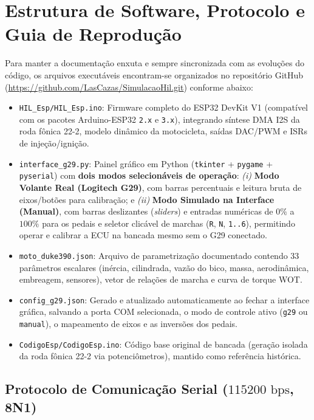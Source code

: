 \documentclass[12pt,a4paper]{article}
\begin{document}
\section{Estrutura de Software, Protocolo e Guia de Reprodução}

Para manter a documentação enxuta e sempre sincronizada com as evoluções do código, os arquivos executáveis encontram-se organizados no repositório GitHub (\url{https://github.com/LasCazas/SimulacaoHil.git}) conforme abaixo:

\begin{itemize}[itemsep=2pt]
    \item \texttt{HIL\_Esp/HIL\_Esp.ino}: Firmware completo do ESP32 DevKit V1 (compatível com os pacotes Arduino-ESP32 \texttt{2.x} e \texttt{3.x}), integrando síntese DMA I2S da roda fônica 22-2, modelo dinâmico da motocicleta, saídas DAC/PWM e ISRs de injeção/ignição.
    \item \texttt{interface\_g29.py}: Painel gráfico em Python (\texttt{tkinter} + \texttt{pygame} + \texttt{pyserial}) com \textbf{dois modos selecionáveis de operação}: \textit{(i)} \textbf{Modo Volante Real (Logitech G29)}, com barras percentuais e leitura bruta de eixos/botões para calibração; e \textit{(ii)} \textbf{Modo Simulado na Interface (Manual)}, com barras deslizantes (\textit{sliders}) e entradas numéricas de $0\%$ a $100\%$ para os pedais e seletor clicável de marchas (\texttt{R}, \texttt{N}, \texttt{1..6}), permitindo operar e calibrar a ECU na bancada mesmo sem o G29 conectado.
    \item \texttt{moto\_duke390.json}: Arquivo de parametrização documentado contendo 33 parâmetros escalares (inércia, cilindrada, vazão do bico, massa, aerodinâmica, embreagem, sensores), vetor de relações de marcha e curva de torque WOT.
    \item \texttt{config\_g29.json}: Gerado e atualizado automaticamente ao fechar a interface gráfica, salvando a porta COM selecionada, o modo de controle ativo (\texttt{g29} ou \texttt{manual}), o mapeamento de eixos e as inversões dos pedais.
    \item \texttt{CodigoEsp/CodigoEsp.ino}: Código base original de bancada (geração isolada da roda fônica 22-2 via potenciômetros), mantido como referência histórica.
\end{itemize}

\subsection{Protocolo de Comunicação Serial (\texorpdfstring{$115200\text{ bps}$}{115200 bps}, 8N1)}
\end{document}
